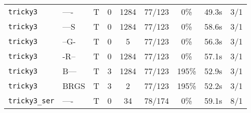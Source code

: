 \begin{tabular}{llccccccc}
\texttt{tricky3} & ---- & T & 0 & 1284 & 77/123 & 0\% & 49.3s & 3/1 \\
\texttt{tricky3} & ---S & T & 0 & 1284 & 77/123 & 0\% & 58.6s & 3/1 \\
\texttt{tricky3} & --G- & T & 0 & 5 & 77/123 & 0\% & 56.3s & 3/1 \\
\texttt{tricky3} & -R-- & T & 0 & 1284 & 77/123 & 0\% & 57.1s & 3/1 \\
\texttt{tricky3} & B--- & T & 3 & 1284 & 77/123 & 195\% & 52.9s & 3/1 \\
\texttt{tricky3} & BRGS & T & 3 & 2 & 77/123 & 195\% & 52.2s & 3/1 \\
\texttt{tricky3_ser} & ---- & T & 0 & 34 & 78/174 & 0\% & 59.1s & 8/1 \\
\bottomrule
\end{tabular}

